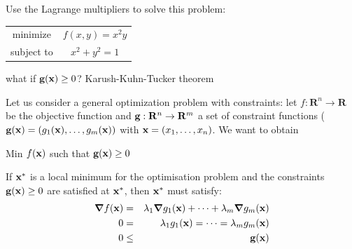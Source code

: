 \documentclass[c]{beamer}
\begin{document}
\begin{frame}
\begin{Exercise}
  Use the Lagrange multipliers to solve this problem:
  \begin{center}
    \begin{tabular}{cc}
      minimize & $f(x,y)=x^2y$ \\
      subject to & $x^2+y^2=1$
    \end{tabular}
  \end{center}
\end{Exercise}
\end{frame}
\begin{frame}{what if $\textbf{g}(\textbf{x})\geq 0$? Karush-Kuhn-Tucker theorem}

  Let us consider a general optimization problem with constraints: let $f:\mathbf{R}^n \rightarrow \mathbf{R}$ be the objective function and $\textbf{g}:\mathbf{R}^n \rightarrow \mathbf{R}^m$ a set of constraint functions ($\textbf{g}(\textbf{x})=(g_1(\textbf{x}),\ldots,g_m(\textbf{x}))$ with $\textbf{x}=(x_1,\ldots,x_n)$. We want to obtain
  \begin{center}
  Min $f(\textbf{x})$ such that $\textbf{g}(\textbf{x})\geq 0$
\end{center}
  \begin{theorem}
    If $\textbf{x}^*$ is a local minimum for the optimisation problem and the constraints $\textbf{g}(\textbf{x})\geq 0$ are satisfied at $\textbf{x}^*$, then $\textbf{x}^*$ must satisfy:
    \begin{eqnarray*}
      \grad f({\textbf{x}})&=&\lambda_1 \grad g_1(\textbf{x})+\cdots+\lambda_m \grad g_m(\textbf{x})\\
      0&=&\lambda_1  g_1(\textbf{x})=\cdots=\lambda_m  g_m(\textbf{x})\\
      0&\leq&\textbf{g}(\textbf{x})
    \end{eqnarray*}
  \end{theorem}

\end{frame}
\end{document}
